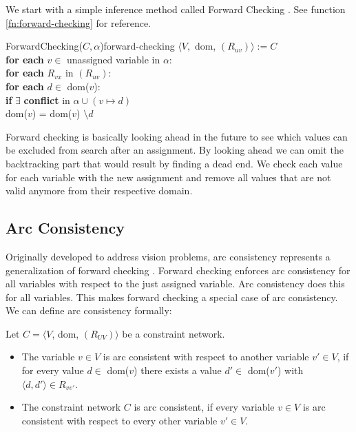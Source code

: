 We start with a simple inference method called Forward Checking \cite{forward_checking:1980}. See function \ref{fn:forward-checking} for reference. \\

\begin{function}{ForwardChecking($C, \alpha$)}{forward-checking}
	$\langle V,$ dom, $(R_{uv})\rangle := C$ \\
	\textbf{for each} $v \in $ unassigned variable in $\alpha$: \\
	\null \qquad \textbf{for each} $R_{vx}$ in $(R_{uv})$: \\
	\null \qquad \qquad \textbf{for each} $d \in$ dom($v$): \\
	\null \qquad \qquad \qquad \textbf{if} $\exists$ \textbf{conflict} in $\alpha \cup (v \mapsto d)$ \\
	\null \qquad \qquad \qquad \qquad dom($v$) = dom($v$) $\setminus d$
\end{function}

Forward checking is basically looking ahead in the future to see which values can be excluded from search after an assignment. By looking ahead we can omit the backtracking part that would result by finding a dead end. We check each value for each variable with the new assignment and remove all values that are not valid anymore from their respective domain.

\subsection{Arc Consistency}

Originally developed to address vision problems, arc consistency represents a generalization of forward checking \cite{original_arc:1988}. Forward checking enforces arc consistency for all variables with respect to the just assigned variable. Arc consistency does this for all variables. This makes forward checking a special case of arc consistency. We can define arc consistency formally:

\begin{tcolorbox}
	Let $C = \langle V$, dom, $(R_{UV})\rangle$ be a constraint network.
	\begin{itemize}
		\item The variable $v \in V$ is arc consistent with respect to another variable $v'\in V$, if for every value $d \in$ dom($v$) there exists a value $d' \in$ dom($v'$) with $\langle d, d' \rangle \in R_{vv'}$.
		\item The constraint network $C$ is arc consistent, if every variable $v \in V$ is arc consistent with respect to every other variable $v' \in V$.
	\end{itemize}
\end{tcolorbox}

